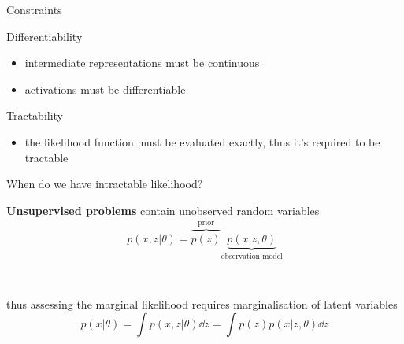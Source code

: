 \documentclass[14pt]{beamer}
\begin{document}
\begin{frame}{Constraints}

	Differentiability
	\begin{itemize}
		\item intermediate representations must be continuous
		\item activations must be differentiable
	\end{itemize}

	Tractability
	\begin{itemize}
		\item the likelihood function must be evaluated exactly, thus it's required to be tractable
	\end{itemize}



\end{frame}




\begin{frame}{When do we have intractable likelihood?}

{\bf Unsupervised problems} contain unobserved random variables\\ 
\begin{equation*}
p(x, z|\theta) = \overbrace{p(z)}^{\text{prior}} \underbrace{p(x|z, \theta)}_{\text{observation model}}
\end{equation*}

~ \pause

thus assessing the marginal likelihood requires \alert{marginalisation of latent variables} 
\begin{equation*}
p(x|\theta) = \int p(x, z|\theta) \dd{z} = \int p(z)p(x|z, \theta) \dd{z} 
\end{equation*}

\end{frame}
\end{document}
